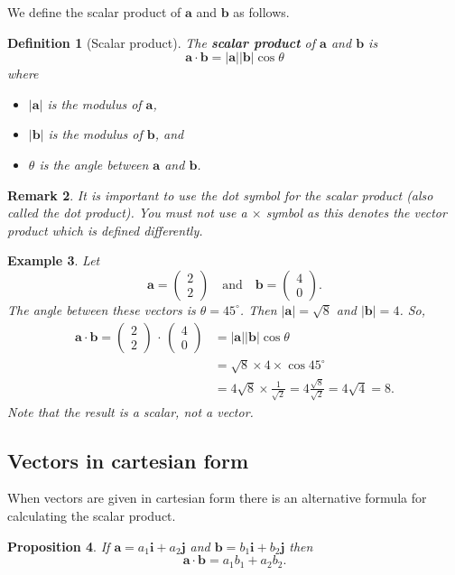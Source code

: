 \documentclass[12pt,a4paper]{article}
\renewcommand{\emph}{\textbf}
\theoremstyle{clearprint}
\newtheorem{proposition}{Proposition}[section]
\newtheorem{definition}[proposition]{Definition}
\newtheorem{remark}[proposition]{Remark}
\newtheorem{example}[proposition]{Example}
\newcommand{\bvec}[1]{\mathrm{\mathbf{#1}}}
\newcommand{\cvec}[2]{\begin{pmatrix} #1 \\ #2 \end{pmatrix}}
\newcommand{\vmod}[1]{\lvert #1 \rvert}
\begin{document}
We define the scalar product of \(\bvec{a}\) and \(\bvec{b}\) as follows. 

\begin{definition}[Scalar product]
The \emph{scalar product} of \(\bvec{a}\) and \(\bvec{b}\) is
\[
\bvec{a}\cdot \bvec{b} = \lvert\bvec{a}\rvert \lvert\bvec{b}\rvert \cos \theta
\]
where
\begin{itemize}
\item \(\lvert\bvec{a}\rvert\) is the modulus of \(\bvec{a}\),
\item \(\lvert\bvec{b}\rvert\) is the modulus of \(\bvec{b}\), and
\item \(\theta\) is the angle between \(\bvec{a}\) and \(\bvec{b}\). 
\end{itemize}
\end{definition}

\begin{remark}
It is important to use the dot symbol for the scalar product (also called the dot product). You must not use a \(\times\) symbol as this denotes the vector product which is defined differently. 
\end{remark}

\begin{example}
Let 
\[
\bvec{a} = \cvec{2}{2} \quad \text{and} \quad \bvec{b} = \cvec{4}{0}.
\]
The angle between these vectors is \(\theta = {45}^{\circ}\). Then \(\vmod{\bvec{a}} = \sqrt{8} \) and \(\vmod{\bvec{b}} = 4\). So, 
\begin{align*}
\bvec{a} \cdot \bvec{b} = \cvec{2}{2}\,\cdot\, \cvec{4}{0} &= \vmod{\bvec{a}}\vmod{\bvec{b}}\cos\theta \\
&= \sqrt{8} \times 4 \times \cos {45}^{\circ} \\
&= 4\sqrt{8}\times \frac{1}{\sqrt{2}} = 4\frac{\sqrt{8}}{\sqrt{2}} = 4\sqrt{4} = 8.
\end{align*} 
Note that the result is a scalar, not a vector. 
\end{example}

\subsection{Vectors in cartesian form}

When vectors are given in cartesian form there is an alternative formula for calculating the scalar product. 
\begin{proposition}
If \(\bvec{a} = a_1\bvec{i} + a_2\bvec{j}\) and \(\bvec{b} = b_1\bvec{i} + b_2\bvec{j}\) then
\[
\bvec{a} \cdot \bvec{b} = a_1b_1 + a_2b_2.
\]
\end{proposition}
\end{document}
